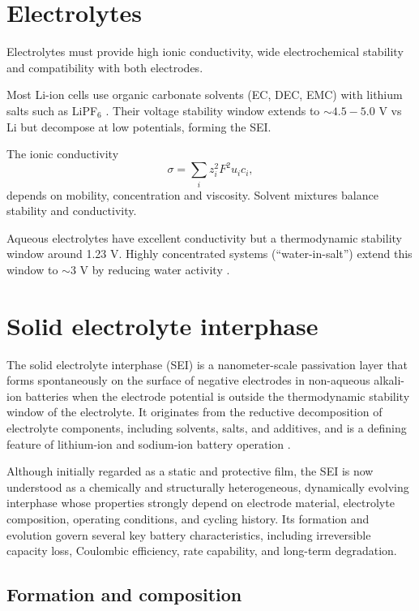 \section{Electrolytes}

Electrolytes must provide high ionic conductivity, wide electrochemical stability and compatibility with both electrodes.

Most Li-ion cells use organic carbonate solvents (EC, DEC, EMC) with lithium salts such as LiPF$_6$ \cite{brunklausMetalElectrodeNextGen2024}. 
Their voltage stability window extends to $\sim 4.5-5.0$ V vs Li but decompose at low potentials, forming the SEI.

The ionic conductivity
\begin{equation}
\sigma = \sum_i z_i^2 F^2 u_i c_i,
\end{equation}
depends on mobility, concentration and viscosity. 
Solvent mixtures balance stability and conductivity.

Aqueous electrolytes have excellent conductivity but a thermodynamic stability window around 1.23 V. 
Highly concentrated systems (“water-in-salt”) extend this window to $\sim 3$ V by reducing water activity \cite{PHOGAT2025117314}.

\section{Solid electrolyte interphase}

The solid electrolyte interphase (SEI) is a nanometer-scale passivation layer that forms spontaneously on the surface of negative electrodes in non-aqueous alkali-ion batteries when the electrode potential is outside the thermodynamic stability window of the electrolyte.
It originates from the reductive decomposition of electrolyte components, including solvents, salts, and additives, and is a defining feature of lithium-ion and sodium-ion battery operation \cite{peledReviewSEIPresent2017}.

Although initially regarded as a static and protective film, the SEI is now understood as a chemically and structurally heterogeneous, dynamically evolving interphase whose properties strongly depend on electrode material, electrolyte composition, operating conditions, and cycling history.
Its formation and evolution govern several key battery characteristics, including irreversible capacity loss, Coulombic efficiency, rate capability, and long-term degradation.

\subsection{Formation and composition}

